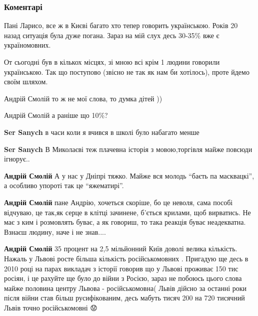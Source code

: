  
 
 
 
 
\subsubsection{Коментарі}
\label{sec:23_06_2021.fb.nicoj_larisa.1.voloshki_kiev_jazyk.cmt}

\begin{itemize}


Пані Ларисо, все ж в Києві багато хто тепер говорить українською. Років 20
назад ситуація була дуже погана. Зараз на мій слух десь 30-35\% вже є
україномовних.

От сьогодні був в кількох місцях, зі мною всі крім 1 людини говорили
українською.  Так що поступово (звісно не так як нам би хотілось), проте йдемо
своїм шляхом.


Андрій Смолій то ж не мої слова, то думка дітей ))


Андрій Смолій а раніше що 10\%?

\textbf{Ser Sanych} в часи коли я вчився в школі було набагато менше

\textbf{Ser Sanych} В Миколаєві теж плачевна історія з мовою,торгівля майже повсюди ігнорує..

\textbf{Андрій Смолій} А у нас у Дніпрі тяжко. Майже вся молодь \enquote{баєть
па масквацкі}, а особливо упороті так це \enquote{яжематирі}.


\textbf{Андрій Смолій} пане Андрію, хочеться скоріше, бо це неволя, сама пособі
відчуваю, це так,як серце в клітці зачинене, б'ється крилами, щоб вирватись.
Не має з ким і розмовлять буває, а як говориш, то така реакція буває
неадекватна.  Взнаєш людину, наче і не знав....


\textbf{Андрій Смолій} 35 процент на 2,5 мільйонний Київ доволі велика
кількість. Нажаль у Львові росте більша кількість російськомовних . Пригадую ще
десь в 2010 році на парах викладач з історії говорив що у Львові проживає 150
тис росіян, і це рахуйте ще було до війни з Росією, зараз не побоюсь цього
слова майже половина центру Львова - російськомовна( Львів дійсно за останні
роки після війни став більш русифікованим, десь мабуть тисяч 200 на 720
тисячний Львів точно російськомовні 😟


\end{itemize}
